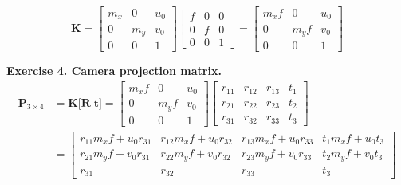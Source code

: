 \documentclass[letterpaper, 11pt]{article}
\begin{document}
$$
    \textbf{K}
    =
    \begin{bmatrix}
        m_x & 0   & u_0 \\
        0   & m_y & v_0 \\
        0   & 0   & 1
    \end{bmatrix}
    \begin{bmatrix}
        f & 0 & 0 \\
        0 & f & 0 \\
        0 & 0 & 1
    \end{bmatrix}
    =
    \begin{bmatrix}
        m_x f & 0     & u_0 \\
        0     & m_y f & v_0 \\
        0     & 0     & 1
    \end{bmatrix}
$$

\textbf{Exercise 4. Camera projection matrix.}\\
\begin{align*}
    \textbf{P}_{3 \times 4} & = \textbf{K}\textbf{}{[}\textbf{R}|\textbf{t}\textbf{}{]}=
    \begin{bmatrix}
        m_x f & 0     & u_0 \\
        0     & m_y f & v_0 \\
        0     & 0     & 1
    \end{bmatrix}
    \begin{bmatrix}
        r_{11} & r_{12} & r_{13} & t_1 \\
        r_{21} & r_{22} & r_{23} & t_2 \\
        r_{31} & r_{32} & r_{33} & t_3
    \end{bmatrix}                                                       \\
                            & =
    \begin{bmatrix}
        r_{11} m_x f + u_0 r_{31} & r_{12}m_x f + u_0 r_{32} & r_{13} m_x f + u_0 r_{33} & t_1 m_x f + u_0 t_3 \\
        r_{21} m_y f + v_0 r_{31} & r_{22}m_y f + v_0 r_{32} & r_{23} m_y f + v_0 r_{33} & t_2 m_y f + v_0 t_3 \\
        r_{31}                    & r_{32}                   & r_{33}                    & t_3
    \end{bmatrix}
\end{align*}
\end{document}
